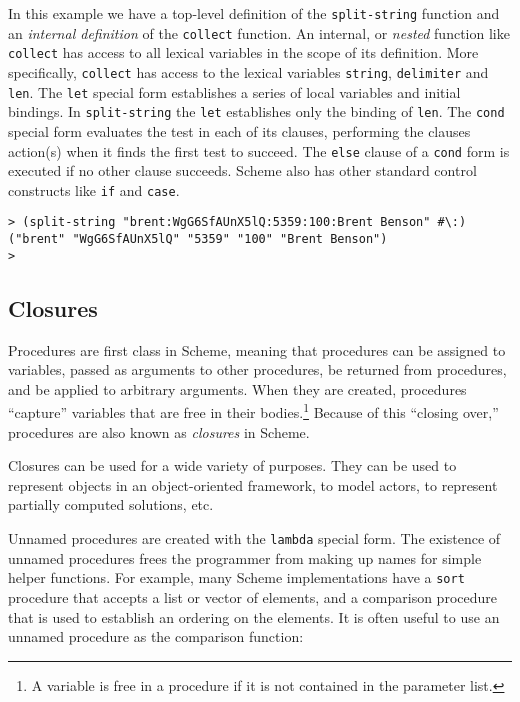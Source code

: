 In this example we have a top-level definition of the
\verb+split-string+ function and an {\em internal definition\/} of the
\verb+collect+ function.  An internal, or {\em nested\/} function like
\verb+collect+ has access to all lexical variables in the scope of its
definition.  More specifically, \verb+collect+ has access to the
lexical variables \verb+string+, \verb+delimiter+ and \verb+len+.  The
\verb+let+ special form establishes a series of local variables and
initial bindings.  In \verb+split-string+ the \verb+let+ establishes
only the binding of \verb+len+.  The \verb+cond+ special form
evaluates the test in each of its clauses, performing the clauses
action(s) when it finds the first test to succeed.  The \verb+else+
clause of a \verb+cond+ form is executed if no other clause succeeds.
Scheme also has other standard control constructs like \verb+if+ and
\verb+case+.

\begin{verbatim}
> (split-string "brent:WgG6SfAUnX5lQ:5359:100:Brent Benson" #\:)
("brent" "WgG6SfAUnX5lQ" "5359" "100" "Brent Benson")
> 
\end{verbatim}

\subsection{Closures}

Procedures are first class in Scheme, meaning that procedures can be
assigned to variables, passed as arguments to other procedures, be
returned from procedures, and be applied to arbitrary arguments.  When
they are created, procedures ``capture'' variables that are free in
their bodies.\footnote{A variable is free in a procedure if it is not
  contained in the parameter list.} Because of this ``closing over,''
procedures are also known as {\em closures\/} in Scheme.

Closures can be used for a wide variety of purposes.  They can be used
to represent objects in an object-oriented framework, to model actors,
to represent partially computed solutions, etc.

Unnamed procedures are created with the \verb+lambda+ special form.
The existence of unnamed procedures frees the programmer from making
up names for simple helper functions.  For example, many Scheme
implementations have a \verb+sort+ procedure that accepts a list or
vector of elements, and a comparison procedure that is used to
establish an ordering on the elements.  It is often useful to use an
unnamed procedure as the comparison function:

